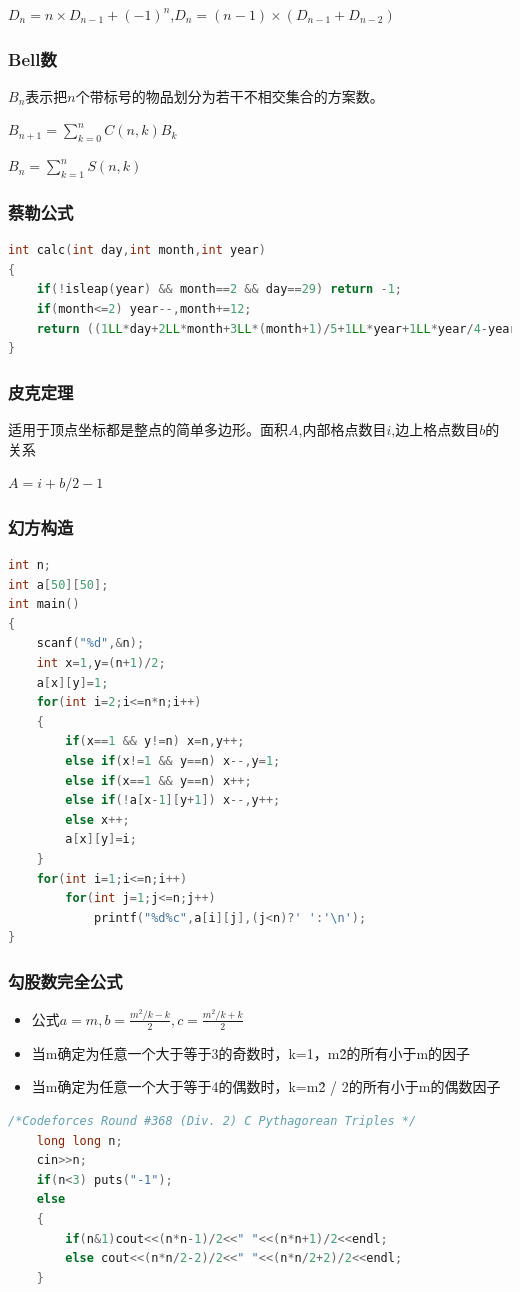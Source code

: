 \documentclass[UTF8,a4paper,titlepage]{ctexart}
\begin{document}
$D_n=n\times D_{n-1}+(-1)^n$,$D_n=(n-1)\times(D_{n-1}+D_{n-2})$

\subsubsection*{Bell数}
$B_n$表示把$n$个带标号的物品划分为若干不相交集合的方案数。\par
$B_{n+1}=\sum_{k=0}^nC(n,k)B_k$\par
$B_{n}=\sum_{k=1}^nS(n,k)$\par     
\subsubsection*{蔡勒公式}
\begin{lstlisting}[language=C++] 
int calc(int day,int month,int year)
{
    if(!isleap(year) && month==2 && day==29) return -1;
    if(month<=2) year--,month+=12;
    return ((1LL*day+2LL*month+3LL*(month+1)/5+1LL*year+1LL*year/4-year/100+year/400)%7+7)%7;
}  
\end{lstlisting}


\subsubsection*{皮克定理}
适用于顶点坐标都是整点的简单多边形。面积$A$,内部格点数目$i$,边上格点数目$b$的关系 \par 
$A=i+b/2-1$

\subsubsection*{幻方构造}
        \begin{lstlisting}[language=C++]
int n;
int a[50][50];
int main()
{
    scanf("%d",&n);
    int x=1,y=(n+1)/2;
    a[x][y]=1;
    for(int i=2;i<=n*n;i++)
    {
        if(x==1 && y!=n) x=n,y++;
        else if(x!=1 && y==n) x--,y=1;
        else if(x==1 && y==n) x++;
        else if(!a[x-1][y+1]) x--,y++;
        else x++;
        a[x][y]=i;
    }
    for(int i=1;i<=n;i++)
        for(int j=1;j<=n;j++)
            printf("%d%c",a[i][j],(j<n)?' ':'\n');
}
        \end{lstlisting}
\subsubsection*{勾股数完全公式}
\begin{itemize}
\item 公式$a=m,b=\frac{m^2/k-k}{2},c=\frac{m^2/k+k}{2}$
\item 当m确定为任意一个大于等于3的奇数时，k={1，m\^2的所有小于m的因子}
\item 当m确定为任意一个大于等于4的偶数时，k={m\^2 / 2的所有小于m的偶数因子}
\end{itemize}
         \begin{lstlisting}[language=C++]   
/*Codeforces Round #368 (Div. 2) C Pythagorean Triples */
    long long n;
    cin>>n;
    if(n<3) puts("-1");
    else
    {
        if(n&1)cout<<(n*n-1)/2<<" "<<(n*n+1)/2<<endl;
        else cout<<(n*n/2-2)/2<<" "<<(n*n/2+2)/2<<endl;
    }
        \end{lstlisting}
\end{document}
